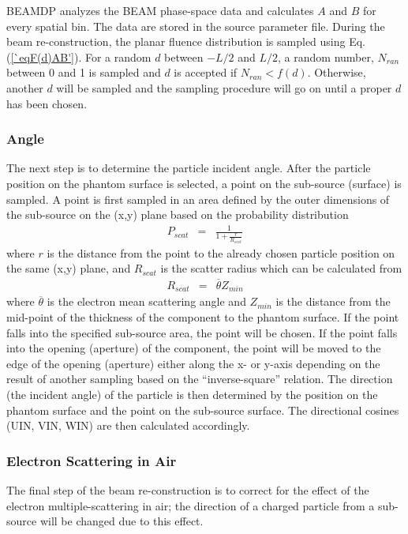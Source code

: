 \documentclass[12pt,twoside]{article}
\begin{document}
BEAMDP analyzes the BEAM phase-space data and calculates $A$ and $B$ for
every spatial bin. The data are stored in the source parameter file.
During the beam re-construction, the planar fluence distribution is
sampled using Eq. (\ref{`eqF(d)AB'}). For a random $d$ between $-L/2$ and
$L/2$, a random number, $N_{ran}$ between 0 and 1 is sampled and $d$ is
accepted if $N_{ran} < f(d)$. Otherwise, another $d$ will be sampled and
the sampling procedure will go on until a proper $d$ has been chosen.

\subsubsection{Angle}
The next step is to determine the particle incident angle. After the
particle position on the phantom surface is selected, a point on the
sub-source (surface) is sampled.  A point is first sampled in an area
defined by the outer dimensions of the sub-source on the (x,y) plane based
on the probability distribution
\begin{eqnarray} P_{scat} & =& \frac{1}{1 + \frac{r}{R_{scat}}} \end{eqnarray}
where $r$ is the distance from the point to the already chosen particle
position  on the same (x,y) plane, and $R_{scat}$ is the scatter radius
which can be calculated from
\begin{eqnarray} R_{scat} & =& \overline{\theta} Z_{min} \end{eqnarray}
where $\overline{\theta}$ is the electron mean scattering angle and
$Z_{min}$ is the distance from the mid-point of the thickness of the
component to the phantom surface. If the point falls into the specified
sub-source area, the point will be chosen. If the point falls into the
opening (aperture) of the component, the point will be moved to the edge
of the opening (aperture) either along the x- or y-axis depending on the
result of another sampling based on the ``inverse-square'' relation. The
direction (the incident angle) of the particle is then determined by the
position on the phantom surface and the point on the sub-source surface.
The directional cosines (UIN, VIN, WIN) are then calculated accordingly.

\subsubsection{Electron Scattering in Air}
The final step of the beam re-construction is to correct for the effect of the electron multiple-scattering in air; the direction of a charged particle from a sub-source will be changed due to this effect.
\end{document}
